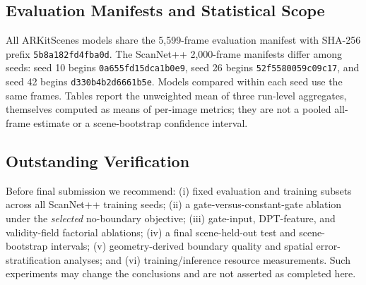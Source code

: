 \subsection{Evaluation Manifests and Statistical Scope}
All ARKitScenes models share the 5,599-frame evaluation manifest with SHA-256 prefix \texttt{5b8a182fd4fba0d}. The ScanNet++ 2,000-frame manifests differ among seeds: seed 10 begins \texttt{0a655fd15dca1b0e9}, seed 26 begins \texttt{52f5580059c09c17}, and seed 42 begins \texttt{d330b4b2d6661b5e}. Models compared within each seed use the same frames. Tables report the unweighted mean of three run-level aggregates, themselves computed as means of per-image metrics; they are not a pooled all-frame estimate or a scene-bootstrap confidence interval.

\subsection{Outstanding Verification}
Before final submission we recommend: (i) fixed evaluation and training subsets across all ScanNet++ training seeds; (ii) a gate-versus-constant-gate ablation under the \emph{selected} no-boundary objective; (iii) gate-input, DPT-feature, and validity-field factorial ablations; (iv) a final scene-held-out test and scene-bootstrap intervals; (v) geometry-derived boundary quality and spatial error-stratification analyses; and (vi) training/inference resource measurements. Such experiments may change the conclusions and are not asserted as completed here.
